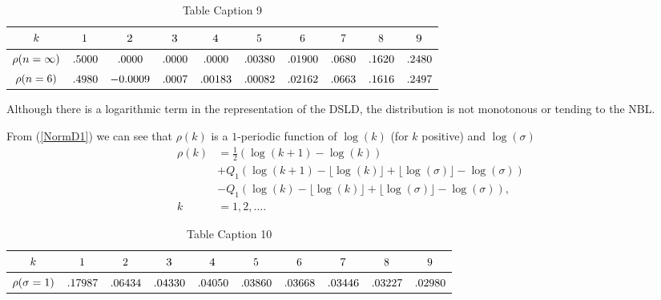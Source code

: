 \documentclass[titlepage,fleqn]{article}%
\begin{document}
\bigskip%

\begin{table}[!htbp] \centering
\begin{tabular}
[c]{|c|c|c|c|c|c|c|c|c|c|}\hline\hline
${\small k}$ & ${\small 1}$ & ${\small 2}$ & ${\small 3}$ & ${\small 4}$ &
${\small 5}$ & ${\small 6}$ & ${\small 7}$ & ${\small 8}$ & ${\small 9}%
$\\\hline
${\small \rho(n=\infty)}$ & ${\small .5000}$ & ${\small .0000}$ &
${\small .0000}$ & ${\small .0000}$ & ${\small .00380}$ & ${\small .01900}$ &
${\small .0680}$ & ${\small .1620}$ & ${\small .2480}$\\\hline
${\small \rho(n=6)}$ & ${\small .4980}$ & ${\small -0.0009}$ & ${\small .0007}%
$ & ${\small .00183}$ & ${\small .00082}$ & ${\small .02162}$ &
${\small .0663}$ & ${\small .1616}$ & ${\small .2497}$\\\hline\hline
\end{tabular}
\caption{Table Caption 9}\label{TableKey9}%
\end{table}%


\bigskip

Although there is a logarithmic term in the representation of the DSLD, the
distribution is not monotonous or tending to the NBL.

From (\ref{NormD1}) we can see that $\rho(k)$ is a $1$-periodic function of
$\log(k)$ (for $k$ positive) and $\log(\sigma)$%
\begin{align}
\rho(k)  &  =\frac{1}{2}\left(  \log(k+1)-\log(k)\right) \label{NormD2}\\
&  +Q_{1}(\log(k+1)-\lfloor\log(k)\rfloor+\lfloor\log(\sigma)\rfloor
-\log(\sigma))\nonumber\\
&  -Q_{1}(\log(k)-\lfloor\log(k)\rfloor+\lfloor\log(\sigma)\rfloor-\log
(\sigma)),\nonumber\\
k  &  =1,2,\ldots.\nonumber
\end{align}
%

\begin{table}[!htbp] \centering
\begin{tabular}
[c]{|c|c|c|c|c|c|c|c|c|c|}\hline\hline
${\small k}$ & ${\small 1}$ & ${\small 2}$ & ${\small 3}$ & ${\small 4}$ &
${\small 5}$ & ${\small 6}$ & ${\small 7}$ & ${\small 8}$ & ${\small 9}%
$\\\hline
${\small \rho(\sigma=1)}$ & ${\small .17987}$ & ${\small .06434}$ &
${\small .04330}$ & ${\small .04050}$ & ${\small .03860}$ & ${\small .03668}$
& ${\small .03446}$ & ${\small .03227}$ & ${\small .02980}$\\\hline\hline
\end{tabular}
\caption{Table Caption 10}\label{TableKey10}%
\end{table}%
\end{document}
